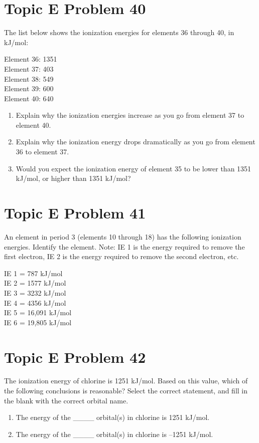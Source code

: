 \documentclass[10pt]{article}
\begin{document}
    \pagebreak
    \section{Topic E Problem 40}
        The list below shows the ionization energies for elements 36 through 40, in kJ/mol:
        \begin{multicols}{3}
            Element 36: 1351\\
            Element 37: 403\\
            Element 38: 549\\
            Element 39: 600\\
            Element 40: 640
        \end{multicols}
        \begin{enumerate}[label=\alph*)]
            \item   Explain why the ionization energies increase as you go from element 37 to element 40.
            \item   Explain why the ionization energy drops dramatically as you go from element 36 to element 37.
            \item   Would you expect the ionization energy of element 35 to be lower than 1351 kJ/mol, or higher than 1351 kJ/mol?
        \end{enumerate}


    \pagebreak
    \section{Topic E Problem 41}
        An element in period 3 (elements 10 through 18) has the following ionization energies.
        Identify the element. 
        Note: IE 1 is the energy required to remove the first electron, IE 2 is the energy required to remove the second electron, etc.
        \begin{multicols}{3}
            IE 1 = 787 kJ/mol\\
            IE 2 = 1577 kJ/mol\\
            IE 3 = 3232 kJ/mol\\
            IE 4 = 4356 kJ/mol\\
            IE 5 = 16,091 kJ/mol\\
            IE 6 = 19,805 kJ/mol
        \end{multicols}


    \pagebreak
    \section{Topic E Problem 42}
        The ionization energy of chlorine is 1251 kJ/mol. 
        Based on this value, which of the following conclusions is reasonable? 
        Select the correct statement, and fill in the blank with the correct orbital name.
        \begin{enumerate}[label=\alph*)]
            \item   The energy of the \_\_\_\_ orbital(s) in chlorine is 1251 kJ/mol.
            \item   The energy of the \_\_\_\_ orbital(s) in chlorine is –1251 kJ/mol.
        \end{enumerate}

    \pagebreak

    \tableofcontents
\end{document}
